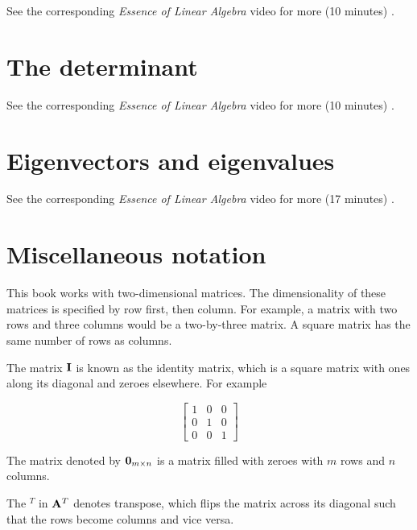 \begin{remark}
  See the corresponding \textit{Essence of Linear Algebra} video for more (10
  minutes) \cite{bib:linalg_matrix_multiplication_as_composition}.
\end{remark}

\section{The determinant}

\begin{remark}
  See the corresponding \textit{Essence of Linear Algebra} video for more (10
  minutes) \cite{bib:linalg_the_determinant}.
\end{remark}

\section{Eigenvectors and eigenvalues}

\begin{remark}
  See the corresponding \textit{Essence of Linear Algebra} video for more (17
  minutes) \cite{bib:linalg_eigenvectors_and_eigenvalues}.
\end{remark}

\section{Miscellaneous notation}

This book works with two-dimensional matrices. The dimensionality of these
matrices is specified by row first, then column. For example, a matrix with two
rows and three columns would be a two-by-three matrix. A square matrix has the
same number of rows as columns.

The matrix $\mathbf{I}$ is known as the identity matrix, which is a square matrix
with ones along its diagonal and zeroes elsewhere. For example

\begin{equation*}
  \begin{bmatrix}
    1 & 0 & 0 \\
    0 & 1 & 0 \\
    0 & 0 & 1
  \end{bmatrix}
\end{equation*}

The matrix denoted by $\mathbf{0}_{m \times n}$ is a matrix filled with zeroes with
$m$ rows and $n$ columns.

The $^T$ in $\mathbf{A}^T$ denotes transpose, which flips the matrix across its
diagonal such that the rows become columns and vice versa.
